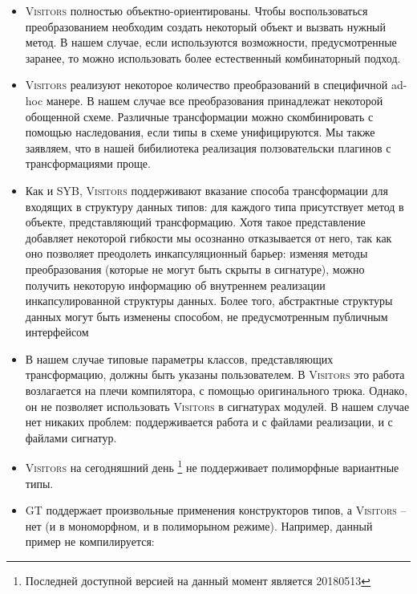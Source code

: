 \begin{itemize}
   \item \textsc{Visitors} полностью объектно-ориентированы. Чтобы воспользоваться преобразованием необходим создать некоторый объект и вызвать нужный метод. В нашем случае, если используются возможности, предусмотренные заранее, то можно использовать более естественный комбинаторный подход.
     
   \item \textsc{Visitors} реализуют некоторое количество преобразований в специфичной ad-hoc манере. В нашем случае все преобразования принадлежат некоторой обощенной схеме. Различные трансформации можно скомбинировать с помощью наследования, если типы в схеме унифицируются. Мы также заявляем, что в нашей бибилиотека реализация ползовательски плагинов с трансформациями проще. 
     
   \item Как и  SYB, \textsc{Visitors} поддерживают вказание способа трансформации для входящих в структуру данных типов: для каждого типа присутствует метод в объекте, представляющий трансформацию. Хотя такое представление добавляет некоторой гибкости мы осознанно отказывается от него, так как оно позволяет преодолеть инкапсуляционный барьер: изменяя методы преобразования (которые не могут быть скрыты в сигнатуре), можно получить некоторую информацию об внутреннем реализации инкапсулированной структуры данных. Более того, абстрактные структуры данных могут быть изменены способом, не предусмотренным публичным интерфейсом

   \item В нашем случае типовые параметры классов, представляющих трансформацию, должны быть указаны пользователем. В \textsc{Visitors} это работа возлагается на плечи компилятора, с помощью оригинального трюка. Однако, он не позволяет использовать \textsc{Visitors} в сигнатурах модулей. В нашем случае нет никаких проблем: поддерживается работа и с файлами реализации, и с файлами сигнатур.

   \item \textsc{Visitors} на сегодняшний день \footnote{Последней доступной версией на данный момент является 20180513} не поддерживает полиморфные вариантные типы.
   
   \item \textsc{GT} поддержает произвольные применения конструкторов типов, а  \textsc{Visitors} -- нет (и в мономорфном, и в полиморыном режиме).
     Например, данный пример не компилируется:
     

\end{itemize}
